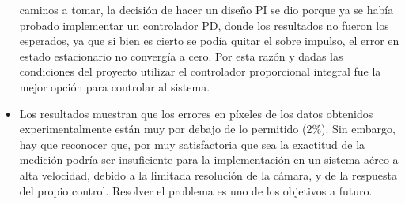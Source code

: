 \begin{itemize}
    caminos a tomar, la decisión de hacer un diseño PI se dio porque ya se había probado implementar un controlador PD, donde los resultados no
    fueron los esperados, ya que si bien es cierto se podía quitar el sobre impulso, el error en estado estacionario no convergía a cero.
    Por esta razón y dadas las condiciones del proyecto utilizar el controlador proporcional integral fue la mejor opción para controlar al
    sistema.
    \item Los resultados muestran que los errores en píxeles de los datos obtenidos experimentalmente están muy por debajo de lo permitido (2\%).
    Sin embargo, hay que reconocer que, por muy satisfactoria que sea la exactitud de la medición podría ser insuficiente para la implementación
    en un sistema aéreo a alta velocidad, debido a la limitada resolución de la cámara, y de la respuesta del propio control. Resolver
    el problema es uno de los objetivos a futuro.
\end{itemize}

